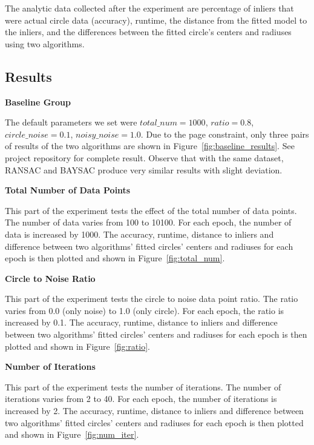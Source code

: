 \documentclass[10pt,twocolumn,letterpaper]{article}
\begin{document}
The analytic data collected after the experiment are percentage of inliers that were actual circle data (accuracy), runtime, the distance from the fitted model to the inliers, and the differences between the fitted circle's centers and radiuses using two algorithms.


\subsection{Results}
\label{sec:results}


\textbf{Baseline Group}

The default parameters we set were $total\_num = 1000$, $ratio = 0.8$, $circle\_noise = 0.1$, $noisy\_noise = 1.0$. Due to the page constraint, only three pairs of results of the two algorithms are shown in Figure~\ref{fig:baseline_results}. See project repository \cite{ProjectRepo} for complete result. Observe that with the same dataset, RANSAC and BAYSAC produce very similar results with slight deviation.


\textbf{Total Number of Data Points}

This part of the experiment tests the effect of the total number of data points. The number of data varies from 100 to 10100. For each epoch, the number of data is increased by 1000. The accuracy, runtime, distance to inliers and difference between two algorithms' fitted circles' centers and radiuses for each epoch is then plotted and shown in Figure~\ref{fig:total_num}.


\textbf{Circle to Noise Ratio}

This part of the experiment tests the circle to noise data point ratio. The ratio varies from 0.0 (only noise) to 1.0 (only circle). For each epoch, the ratio is increased by 0.1. The accuracy, runtime, distance to inliers and difference between two algorithms' fitted circles' centers and radiuses for each epoch is then plotted and shown in Figure~\ref{fig:ratio}.


\textbf{Number of Iterations}

This part of the experiment tests the number of iterations. The number of iterations varies from 2 to 40. For each epoch, the number of iterations is increased by 2. The accuracy, runtime, distance to inliers and difference between two algorithms' fitted circles' centers and radiuses for each epoch is then plotted and shown in Figure~\ref{fig:num_iter}.
\end{document}
